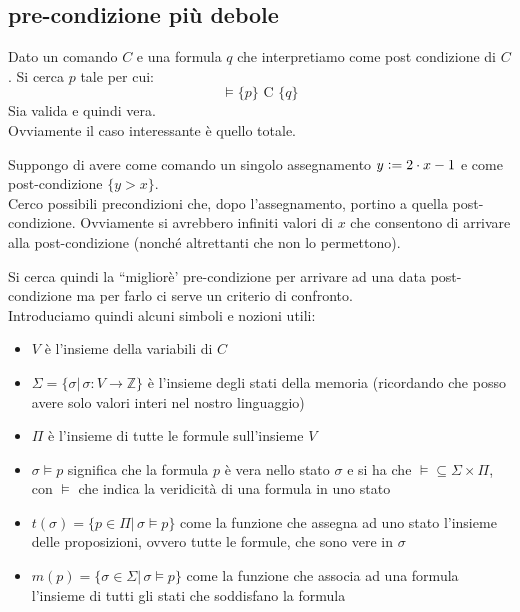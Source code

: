 				      				\subsection{pre-condizione più debole}
				      				Dato un comando $C$ e una formula $q$ che interpretiamo come post condizione di
				      				$C$. Si cerca $p$ tale per cui:
				      				\[\vDash\{p\}\mbox{ C } \{q\}\]
				      				Sia valida e quindi vera.\\
				      				Ovviamente il caso interessante è quello totale.
				      				\begin{esempio}
				      					Suppongo di avere come comando un singolo assegnamento $y\cceq 2\cdot x-1$ e
				      					come post-condizione $\{y>x\}$.\\
				      					Cerco possibili precondizioni che, dopo l'assegnamento, portino a quella
				      					post-condizione. Ovviamente si avrebbero infiniti valori di $x$ che consentono
				      					di arrivare alla post-condizione (nonché altrettanti che non lo permettono). 
				      				\end{esempio}
				      				Si cerca quindi la ``migliorè' pre-condizione per arrivare ad una data
				      				post-condizione ma per farlo ci serve un criterio di confronto. \\
				      				Introduciamo quindi alcuni simboli e nozioni utili:
				      				\begin{itemize}
				      					\item $V$ è l'insieme della variabili di $C$
				      					\item $\Sigma=\{\sigma|\,\sigma:V\to\mathbb{Z}\}$ è l'insieme degli stati
				      					      della memoria (ricordando che posso avere solo valori interi nel nostro
				      					      linguaggio)
				      					\item $\Pi$ è l'insieme di tutte le formule sull'insieme $V$
				      					\item $\sigma \vDash p$ significa che la formula $p$ è vera nello stato
				      					      $\sigma$ e si ha che $\vDash\subseteq\Sigma\times \Pi$, con $\vDash$ che
				      					      indica la veridicità di una formula in uno stato
				      					\item $t(\sigma)=\{p\in \Pi|\,\sigma\vDash p\}$ come la funzione che assegna
				      					      ad uno stato l'insieme delle proposizioni, ovvero tutte le formule, che sono
				      					      vere in $\sigma$
				      					\item $m(p)=\{\sigma\in \Sigma|\,\sigma\vDash p\}$ come la funzione che
				      					      associa ad una formula l'insieme di tutti gli stati che soddisfano la formula
				      				\end{itemize}
